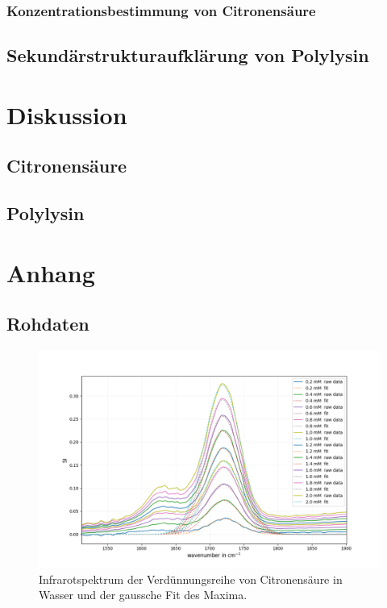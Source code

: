 \documentclass[10pt,a4paper]{article}
\begin{document}
	\subsubsection{Konzentrationsbestimmung von Citronensäure}
	\subsection{Sekundärstrukturaufklärung von Polylysin}
	
	
	
	\section{Diskussion}
	\subsection{Citronensäure}
	\subsection{Polylysin}
	
	\section{Anhang}
	\subsection{Rohdaten}
		
		\begin{figure}[H]
			\centering
			\includegraphics[scale=0.60]{Standardcurve_citricacid_fit.png}
			\caption{Infrarotspektrum der Verdünnungsreihe von Citronensäure in Wasser und der gaussche Fit des Maxima.}
			\label{fig:IR_Standardcurve}
		\end{figure}
	
\end{document}
